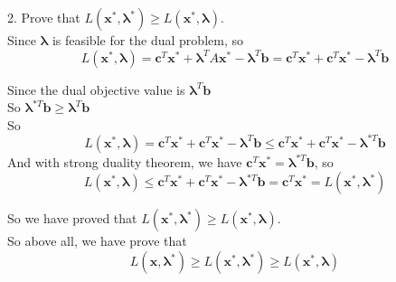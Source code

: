 \documentclass[10pt]{article}
\begin{document}
2. Prove that $L(\bm{x}^*, \bm{\lambda}^*) \geq L(\bm{x}^*, \bm{\lambda})$.\\
Since $\bm{\lambda}$ is feasible for the dual problem, so
$$L(\bm{x}^*,\bm{\lambda})=\bm{c}^T\bm{x}^* + \bm{\lambda}^TA\bm{x}^* - \bm{\lambda}^T\bm{b} = \bm{c}^T\bm{x}^* + \bm{c}^T\bm{x}^* - \bm{\lambda}^T\bm{b}$$

Since the dual objective value is $\bm{\lambda}^T\bm{b}$\\
So $\bm{\lambda}^{*T}\bm{b}\geq \bm{\lambda}^T\bm{b}$\\
So
$$L(\bm{x}^*,\bm{\lambda})=\bm{c}^T\bm{x}^* + \bm{c}^T\bm{x}^* - \bm{\lambda}^T\bm{b}\leq \bm{c}^T\bm{x}^* + \bm{c}^T\bm{x}^* - \bm{\lambda}^{*T}\bm{b}$$
And with strong duality theorem, we have $\bm{c}^T\bm{x}^* = \bm{\lambda}^{*T}\bm{b}$, so
$$L(\bm{x}^*,\bm{\lambda})\leq \bm{c}^T\bm{x}^* + \bm{c}^T\bm{x}^* - \bm{\lambda}^{*T}\bm{b}=\bm{c}^T\bm{x}^*=L(\bm{x}^*, \bm{\lambda}^*)$$

So we have proved that $L(\bm{x}^*, \bm{\lambda}^*) \geq L(\bm{x}^*, \bm{\lambda})$.\\

So above all, we have prove that 
$$L(\bm{x}, \bm{\lambda}^*) \geq L(\bm{x}^*, \bm{\lambda}^*) \geq L(\bm{x}^*, \bm{\lambda})$$

\newpage

\end{document}
